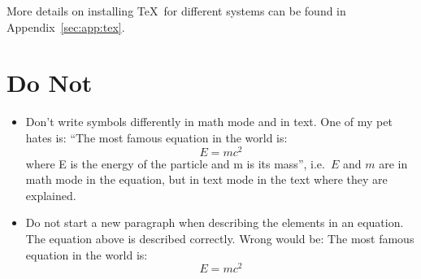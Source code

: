 More details on installing \TeX\ for different systems can be found
in Appendix~\ref{sec:app:tex}.


\section{Do Not}
\label{sec:tips:dont}

\begin{itemize}
\item Don't write symbols differently in math mode and in text. One of
  my pet hates is:
  \enquote{The most famous equation in the world is:
  \begin{equation}
    \label{eq:emc2}
    E = m c^{2}
  \end{equation}
  where E is the energy of the particle and m is its mass}, i.e.\ $E$
  and $m$ are in math mode in the equation, but in text mode in the
  text where they are explained.
\item Do not start a new paragraph when describing the elements in an equation.
  The equation above is described correctly. Wrong would be:
  The most famous equation in the world is:
  \begin{equation}
    \label{eq:emc2}
    E = m c^{2}
  \end{equation}
  

\end{itemize}
